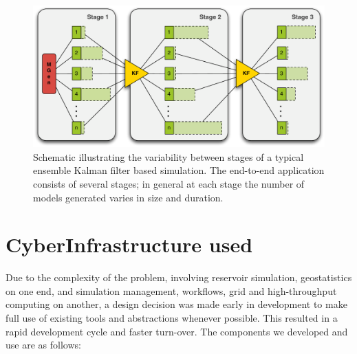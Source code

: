 \documentclass[10pt,conference,final]{IEEEtran}
\begin{document}
\begin{figure}
\begin{center}
\includegraphics*[scale=0.33,angle=0]{figures/3StageKalmanFilter}
\end{center}
\caption{Schematic illustrating the variability between stages of a typical
  ensemble Kalman filter based simulation. The end-to-end
  application consists of several stages; in general at each stage the
  number of models generated varies in size and duration.}
\label{fig:irregular_execution}
\end{figure}

\section*{CyberInfrastructure used}

Due to the complexity of the problem, involving reservoir simulation, geostatistics on one 
end, and simulation management, workflows, grid and high-throughput computing on another, 
a design decision was made early in development to make full use of existing tools and 
abstractions whenever possible. This resulted in a rapid development cycle and faster 
turn-over. The components we developed and use are as follows:
\end{document}
